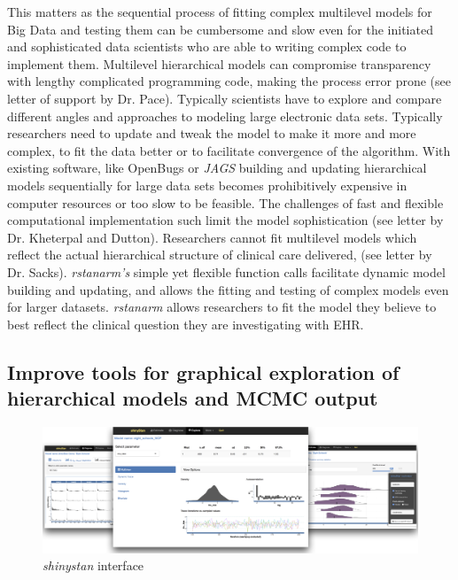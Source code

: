 \documentclass[11pt,notitlepage]{article}
\begin{document}
This matters as the sequential process of fitting complex multilevel models for Big Data  and testing them can be cumbersome and slow even for the initiated and sophisticated data scientists who are able to writing complex code to implement them. Multilevel hierarchical models can compromise transparency with lengthy complicated programming code, making the process error prone (see letter of support by Dr. Pace). Typically scientists have to explore and compare different angles and approaches to modeling large electronic data sets. Typically researchers need to update and tweak the model to make it more and more complex, to fit the data better or to facilitate convergence of the algorithm. With existing software, like OpenBugs or \textit{JAGS} building and updating hierarchical models sequentially for large data sets becomes prohibitively expensive in computer resources or too slow to be feasible. The challenges of fast and flexible computational implementation such limit the model sophistication (see letter by Dr. Kheterpal and Dutton). Researchers cannot fit multilevel models which reflect the actual hierarchical structure of clinical care delivered, (see letter by Dr. Sacks). \textit{rstanarm's} simple yet flexible function calls facilitate dynamic model building and updating, and allows the fitting and testing of complex models even for larger datasets. \textit{rstanarm} allows researchers to fit the model they believe to best reflect the clinical question they are investigating with EHR.

\subsection*{Improve tools for graphical exploration of hierarchical models and MCMC output}

\begin{figure}
  \vspace{-10pt}
 \includegraphics[scale=0.85]{Figures/shinystan.png}
  \vspace{-10pt}
  \caption{\textit{shinystan} interface}
    \label{fig:shinystan}
 \vspace{- 10pt}
\end{figure}
\end{document}
